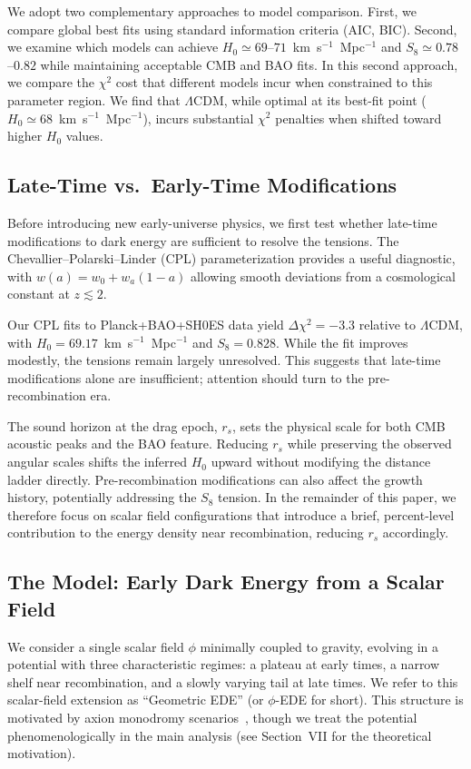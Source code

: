 \documentclass[a4paper,11pt]{article}
\begin{document}
We adopt two complementary approaches to model comparison. First, we compare global best fits using standard information criteria (AIC, BIC). Second, we examine which models can achieve $H_0 \simeq 69$--$71$~km~s$^{-1}$~Mpc$^{-1}$ and $S_8 \simeq 0.78$--$0.82$ while maintaining acceptable CMB and BAO fits. In this second approach, we compare the $\chi^2$ cost that different models incur when constrained to this parameter region. We find that $\Lambda$CDM, while optimal at its best-fit point ($H_0 \simeq 68$~km~s$^{-1}$~Mpc$^{-1}$), incurs substantial $\chi^2$ penalties when shifted toward higher $H_0$ values.

\subsection{Late-Time vs.\ Early-Time Modifications}

Before introducing new early-universe physics, we first test whether late-time modifications to dark energy are sufficient to resolve the tensions. The Chevallier--Polarski--Linder (CPL) parameterization provides a useful diagnostic, with $w(a) = w_0 + w_a(1-a)$ allowing smooth deviations from a cosmological constant at $z \lesssim 2$.

Our CPL fits to Planck+BAO+SH0ES data yield $\Delta\chi^2 = -3.3$ relative to $\Lambda$CDM, with $H_0 = 69.17$~km~s$^{-1}$~Mpc$^{-1}$ and $S_8 = 0.828$. While the fit improves modestly, the tensions remain largely unresolved. This suggests that late-time modifications alone are insufficient; attention should turn to the pre-recombination era.

The sound horizon at the drag epoch, $r_s$, sets the physical scale for both CMB acoustic peaks and the BAO feature. Reducing $r_s$ while preserving the observed angular scales shifts the inferred $H_0$ upward without modifying the distance ladder directly. Pre-recombination modifications can also affect the growth history, potentially addressing the $S_8$ tension. In the remainder of this paper, we therefore focus on scalar field configurations that introduce a brief, percent-level contribution to the energy density near recombination, reducing $r_s$ accordingly.

\subsection{The Model: Early Dark Energy from a Scalar Field}

We consider a single scalar field $\phi$ minimally coupled to gravity, evolving in a potential with three characteristic regimes: a plateau at early times, a narrow shelf near recombination, and a slowly varying tail at late times. We refer to this scalar-field extension as ``Geometric EDE'' (or $\phi$-EDE for short). This structure is motivated by axion monodromy scenarios~\cite{Silverstein_Westphal,McAllister_monodromy}, though we treat the potential phenomenologically in the main analysis (see Section~VII for the theoretical motivation).
\end{document}
